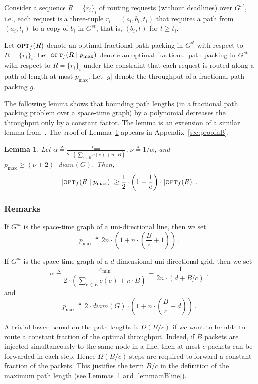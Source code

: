 \documentclass[11pt]{article}
\newtheorem{lemma}[theorem]{Lemma}
\newcommand{\opt}{\text{\textsc{opt}}}
\newcommand{\pmax}{p_{\max}}
\newcommand{\eqdf}{\triangleq}
\newenvironment{proof sketch}[1]{\noindent {\emph{Proof sketch of #1:}}}{\hfill \qed}
\newcommand{\diam}{\textit{diam}}
\begin{document}
Consider a sequence $R=\{r_i\}_i$ of routing requests (without deadlines) over $G^{st}$, i.e., each request is a three-tuple $r_i = (a_i,b_i,t_i)$ that requires a path from $(a_i,t_i)$ to a copy of $b_i$ in $G^{st}$, that is, $(b_i,t)$ for $t \geq t_i$.

Let $\opt_f(R)$ denote an optimal fractional path packing in $G^{st}$ with respect to $R=\{r_i\}_i$.
Let $\opt_f(R \mid \pmax)$ denote an optimal fractional path packing in $G^{st}$ with respect to $R=\{r_i\}_i$ under the constraint that each request is routed along a path of length at most $\pmax$.
Let $|g|$ denote the throughput of a fractional path packing $g$.


The following lemma shows that bounding path lengths (in a fractional
path packing problem over a space-time graph) by a polynomial
decreases the throughput only by a constant factor.  The
lemma is an extension of a similar lemma from~\cite{AZ}.
The proof of Lemma~\ref{lemma:nB} appears in Appendix~\ref{sec:proofnB}.

\begin{lemma}\label{lemma:nB}
  Let $\alpha\eqdf\frac{c_{\min}}{2\cdot
    (\sum_{e\in E} c(e)+n\cdot B)}$, $\nu\eqdf1/\alpha$, and $\pmax\geq
  (\nu+2)\cdot \diam(G)$.  Then, $$|\opt_f(R \mid \pmax)| \geq \frac
  1{2} \cdot \left(1-\frac 1e\right) \cdot |\opt_f(R)|\:.$$
\end{lemma}


\subsubsection{Remarks}
\begin{inparaenum}[(1)]
\item If $G^{st}$ is the space-time graph of a
    uni-directional line, then we set  $$\pmax\triangleq
    2n  \cdot \left(1+n \cdot
    \left(\frac{B}{c}+1\right)\right)\:.$$
\item If $G^{st}$ is the space-time graph of a
    $d$-dimensional uni-directional grid, then we set
    $$\alpha\eqdf\frac{c_{\min}}{2\cdot (\sum_{e\in E}
    c(e)+n\cdot B)} = \frac{1}{2n\cdot (d +B/c)}\:,$$
    and $$\pmax\triangleq 2 \cdot \diam(G)\cdot \left(1+n\cdot \left(\frac{B}{c} + d \right)\right) \:.$$
\item
 A trivial lower bound on the path lengths is $\Omega(B/c)$ if we want to be
  able to route a constant fraction of the optimal throughput. Indeed, if $B$ packets
  are injected simultaneously to the same node in a line, then at most $c$ packets
  can be forwarded in each step. Hence $\Omega(B/c)$ steps are required to forward a
  constant fraction of the packets. This justifies the term $B/c$ in the definition
  of the maximum path length (see Lemmas~\ref{lemma:nB} and \ref{lemma:nBline}).
\end{inparaenum}
\end{document}
